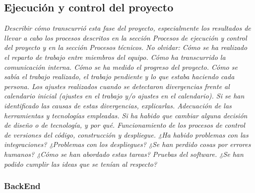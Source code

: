\subsection{Ejecución y control del proyecto}
\label{Ejecucion y control del proyecto}
\emph{
Describir cómo transcurrió esta fase del proyecto, especialmente los resultados de llevar a cabo los procesos descritos en la sección Procesos de ejecución y control del proyecto y en la sección Procesos técnicos. No olvidar:
Cómo se ha realizado el reparto de trabajo entre miembros del equipo. Cómo ha transcurrido la comunicación interna. 
Cómo se ha medido el progreso del proyecto. Cómo se sabía el trabajo realizado, el trabajo pendiente y lo que estaba haciendo cada persona.
Los ajustes realizados cuando se detectaron divergencias frente al calendario inicial (ajustes en el trabajo y/o ajustes en el calendario). Si se han identificado las causas de estas divergencias, explicarlas.
Adecuación de las herramientas y tecnologías empleadas. Si ha habido que cambiar alguna decisión de diseño o de tecnología, y por qué.
Funcionamiento de los procesos de control de versiones del código, construcción y despliegue. ¿Ha habido problemas con las integraciones? ¿Problemas con los despliegues? ¿Se han perdido cosas por errores humanos? ¿Cómo se han abordado estas tareas?
Pruebas del software. ¿Se han podido cumplir las ideas que se tenían al respecto?}
\subsubsection{BackEnd}

